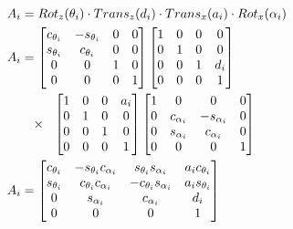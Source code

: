 \begin{align}
    A_i & = Rot_z(\theta_i) \cdot Trans_z(d_i) \cdot Trans_x(a_i) \cdot Rot_x(\alpha_i)             \\
    A_i & = \begin{bmatrix}
                c_{\theta_i} & -s_{\theta_i} & 0 & 0 \\
                s_{\theta_i} & c_{\theta_i}  & 0 & 0 \\
                0            & 0             & 1 & 0 \\
                0            & 0             & 0 & 1
            \end{bmatrix} \begin{bmatrix}
                              1 & 0 & 0 & 0   \\
                              0 & 1 & 0 & 0   \\
                              0 & 0 & 1 & d_i \\
                              0 & 0 & 0 & 1
                          \end{bmatrix} \notag                                                    \\
        & \phantom{=} \times \ \ \begin{bmatrix}
                                     1 & 0 & 0 & a_i \\
                                     0 & 1 & 0 & 0   \\
                                     0 & 0 & 1 & 0   \\
                                     0 & 0 & 0 & 1
                                 \end{bmatrix} \begin{bmatrix}
                                                   1 & 0            & 0             & 0 \\
                                                   0 & c_{\alpha_i} & -s_{\alpha_i} & 0 \\
                                                   0 & s_{\alpha_i} & c_{\alpha_i}  & 0 \\
                                                   0 & 0            & 0             & 1
                                               \end{bmatrix} \notag                 \\
    A_i & = \begin{bmatrix}
                c_{\theta_i} & -s_{\theta_i}c_{\alpha_i} & s_{\theta_i}s_{\alpha_i}  & a_i c_{\theta_i} \\
                s_{\theta_i} & c_{\theta_i}c_{\alpha_i}  & -c_{\theta_i}s_{\alpha_i} & a_i s_{\theta_i} \\
                0            & s_{\alpha_i}              & c_{\alpha_i}              & d_i              \\
                0            & 0                         & 0                         & 1
            \end{bmatrix} \label{eq:dh-matrix}
\end{align}

